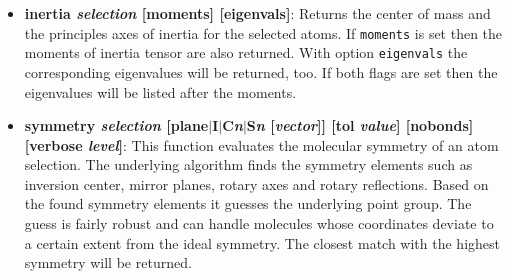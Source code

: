 \begin{itemize}
\item {\bf inertia {\it selection} [moments] [eigenvals]}:
  Returns the center of mass and the principles axes of inertia
  for the selected atoms. If {\tt moments} is set then the moments
  of inertia tensor are also returned. With option {\tt eigenvals}
  the corresponding eigenvalues will be returned, too. If both
  flags are set then the eigenvalues will be listed after the
  moments.


\item {\bf symmetry {\it selection}
     [plane$\mid$I$\mid$C{\it n}$\mid$S{\it n} [{\it vector}]]
     [tol {\it value}] [nobonds] [verbose {\it level}]}:
  This function evaluates the molecular symmetry of an atom selection.
  The underlying algorithm finds the symmetry elements such as 
  inversion center, mirror planes, rotary axes and rotary reflections.
  Based on the found symmetry elements it guesses the underlying
  point group.
  The guess is fairly robust and can handle molecules whose
  coordinates deviate to a certain extent from the ideal
  symmetry. The closest match with the highest symmetry will
  be returned.


\end{itemize}

